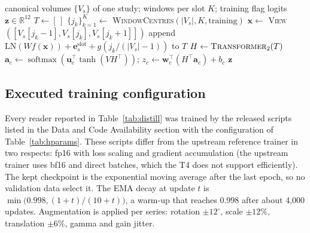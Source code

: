 \documentclass{ieeeaccess}
\begin{document}
\begin{algorithm}[!t]
\caption{Forward pass of the 2.5D multi-slot reader (reused)}
\label{alg:reader}
\begin{algorithmic}[1]
\Require canonical volumes $\{V_s\}$ of one study; windows per slot $K$; training flag
\Ensure logits $\mathbf{z}\in\mathbb{R}^{12}$
\State $T\gets[\,]$
  \State $\{j_k\}_{k=1}^{K}\gets$ \textsc{WindowCentres}$(|V_s|,K,\text{training})$
    \State $\mathbf{x}\gets$ \textsc{View}$([V_s[j_k{-}1],V_s[j_k],V_s[j_k{+}1]])$ 
    \State append $\mathrm{LN}(Wf(\mathbf{x}))+\mathbf{e}^{\mathrm{slot}}_s+g(j_k/(|V_s|-1))$ to $T$
  \EndFor
\EndFor
\State $H\gets\textsc{Transformer}_{2}(T)$ 
  \State $\mathbf{a}_c\gets\operatorname{softmax}(\mathbf{u}_c^{\top}\tanh(VH^{\top}))$;\; $z_c\gets\mathbf{w}_c^{\top}(H^{\top}\mathbf{a}_c)+b_c$
\EndFor
\State \Return $\mathbf{z}$
\end{algorithmic}
\end{algorithm}

\subsection{Executed training configuration}
\label{sec:method-opt}
Every reader reported in Table~\ref{tab:distill} was trained by the released scripts listed in the Data and Code
Availability section with the configuration of Table~\ref{tab:hparams}. These scripts differ from the upstream reference
trainer in two respects: fp16 with loss scaling and gradient accumulation (the upstream trainer uses bf16 and direct
batches, which the T4 does not support efficiently). The kept checkpoint is the exponential moving average after the last
epoch, so no validation data select it. The EMA decay at update $t$ is $\min\big(0.998,(1+t)/(10+t)\big)$, a warm-up that
reaches 0.998 after about 4,000 updates. Augmentation is applied per series: rotation $\pm12^\circ$, scale $\pm12\%$,
translation $\pm6\%$, gamma and gain jitter.
\end{document}
